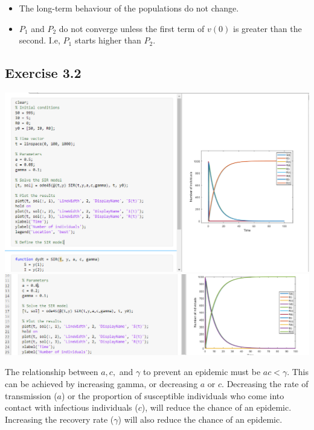 \documentclass{article}
\newcommand{\myskip}{\par\null\par}
\begin{document}
\begin{itemize}
\end{itemize}
\begin{itemize}
    \item The long-term behaviour of the populations do not change.
    \item $P_1$ and $P_2$ do not converge unless the first term of $v(0)$ is greater than the second. I.e, $P_1$ starts higher than $P_2$.
\end{itemize}
\subsection*{Exercise 3.2}
\includegraphics[scale=.3]{Pictures/Pic4.png}\newline\includegraphics[scale=.3]{Pictures/Pic5.png}\myskip The relationship between $a,c,$ and $\gamma$ to prevent an epidemic must be $ac<\gamma$. This can be achieved by increasing gamma, or decreasing $a$ or $c$. Decreasing the rate of transmission ($a$) or the proportion of susceptible individuals who come into contact with infectious individuals ($c$), will reduce the chance of an epidemic. Increasing the recovery rate ($\gamma$) will also reduce the chance of an epidemic.
\end{document}
